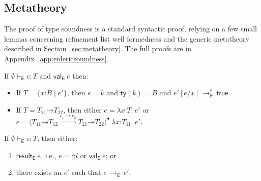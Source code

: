 \documentclass[9pt]{extarticle}
\newcommand{\ottnt}[1]{\mathit{#1}}
\newcommand{\ottsym}[1]{#1}
\begin{document}
{\ifpopl 

\subsection{Metatheory}
\label{sec:eideticmetatheory}

The proof of type soundness is a standard syntactic proof, relying on
a few small lemmas concerning refinement list well formedness and the
generic metatheory described in Section~\ref{sec:metatheory}. The full
proofs are in Appendix~\ref{app:eideticsoundness}.

\begin{lemma}
  If $ \emptyset   \vdash _{  \mathsf{E}  }  \ottnt{e}  :  \ottnt{T} $ and $ \mathsf{val} _{  \mathsf{E}  }~ \ottnt{e} $ then:
\begin{itemize}
  \item If $\ottnt{T}  \ottsym{=}   \{ \mathit{x} \mathord{:} \ottnt{B} \mathrel{\mid} \ottnt{e'} \} $, then $\ottnt{e}  \ottsym{=}  \ottnt{k}$ and $ \mathsf{ty} ( \ottnt{k} )   \ottsym{=}  \ottnt{B}$
    and $ \ottnt{e'}  [  \ottnt{e} / \mathit{x}  ]  \,  \longrightarrow ^{*}_{  \mathsf{E}  }  \,  \mathsf{true} $.
  \item If $\ottnt{T}  \ottsym{=}   \ottnt{T_{{\mathrm{21}}}} \mathord{ \rightarrow } \ottnt{T_{{\mathrm{22}}}} $, then either $\ottnt{e}  \ottsym{=}   \lambda \mathit{x} \mathord{:} \ottnt{T} .~  \ottnt{e'} $ or $\ottnt{e}  \ottsym{=}   \langle   \ottnt{T_{{\mathrm{11}}}} \mathord{ \rightarrow } \ottnt{T_{{\mathrm{12}}}}   \mathord{ \overset{ \ottnt{c_{{\mathrm{1}}}}  \mapsto  \ottnt{c_{{\mathrm{2}}}} }{\Rightarrow} }   \ottnt{T_{{\mathrm{21}}}} \mathord{ \rightarrow } \ottnt{T_{{\mathrm{22}}}}   \rangle^{\bullet} ~   \lambda \mathit{x} \mathord{:} \ottnt{T_{{\mathrm{11}}}} .~  \ottnt{e'}  $.
  \end{itemize}
\end{lemma}

\begin{lemma}
  If $ \emptyset   \vdash _{  \mathsf{E}  }  \ottnt{e}  :  \ottnt{T} $, then either:
  \begin{enumerate}
  \item $ \mathsf{result} _{  \mathsf{E}  }~ \ottnt{e} $, i.e., $\ottnt{e}  \ottsym{=}   \mathord{\Uparrow}  \ottnt{l} $ or $ \mathsf{val} _{  \mathsf{E}  }~ \ottnt{e} $;
    or
  \item there exists an $\ottnt{e'}$ such that $\ottnt{e} \,  \longrightarrow _{  \mathsf{E}  }  \, \ottnt{e'}$.
  \end{enumerate}
\end{lemma}

}
\end{document}
